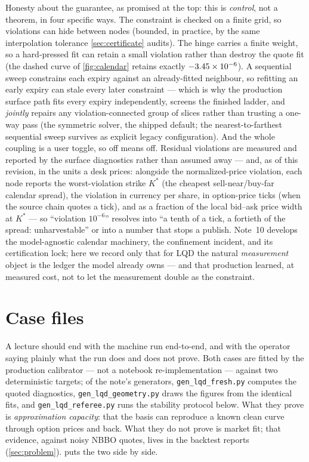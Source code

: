 \documentclass[11pt]{article}
\begin{document}
Honesty about the guarantee, as promised at the top: this is \emph{control},
not a theorem, in four specific ways.  The constraint is checked on a
finite grid, so violations can hide between nodes (bounded, in practice,
by the same interpolation tolerance \cref{sec:certificate} audits).  The
hinge carries a finite weight, so a hard-pressed fit can retain a small
violation rather than destroy the quote fit (the dashed curve of
\cref{fig:calendar} retains exactly $-3.45\times10^{-6}$).  A sequential
sweep constrains each expiry against an already-fitted neighbour, so
refitting an early expiry can stale every later constraint --- which is why
the production surface path fits every expiry independently, screens the
finished ladder, and \emph{jointly} repairs any violation-connected group
of slices rather than trusting a one-way pass (the symmetric solver, the
shipped default; the nearest-to-farthest sequential sweep survives as
explicit legacy configuration).  And the whole coupling is a user toggle,
so off means off.
Residual violations are measured and reported by the surface diagnostics
rather than assumed away --- and, as of this revision, in the units a desk
prices: alongside the normalized-price violation, each node reports the
worst-violation strike $K^{\ast}$ (the cheapest sell-near/buy-far calendar
spread), the violation in currency per share, in option-price ticks (when
the source chain quotes a tick), and as a fraction of the local bid--ask
price width at $K^{\ast}$ --- so ``violation $10^{-6}$'' resolves into
``a tenth of a tick, a fortieth of the spread: unharvestable'' or into a
number that stops a publish.  Note~10 develops the
model-agnostic calendar machinery, the confinement incident, and its
certification lock; here we record only that for LQD the natural
\emph{measurement} object is the ledger the model already owns --- and that
production learned, at measured cost, not to let the measurement double as
the constraint.

\section{Case files}
\label{sec:cases}

A lecture should end with the machine run end-to-end, and with the operator
saying plainly what the run does and does not prove.  Both cases are fitted
by the production calibrator --- not a notebook re-implementation ---
against two deterministic targets; of the note's generators,
\texttt{gen\_lqd\_fresh.py} computes the quoted diagnostics,
\texttt{gen\_lqd\_geometry.py} draws the figures from the identical fits,
and \texttt{gen\_lqd\_referee.py} runs the stability protocol below.  What they prove is \emph{approximation capacity}:
that the basis can reproduce a known clean curve through option prices and
back.  What they do not prove is market fit; that evidence, against noisy
NBBO quotes, lives in the backtest reports (\cref{sec:problem}).
 puts the two side by side.
\end{document}
